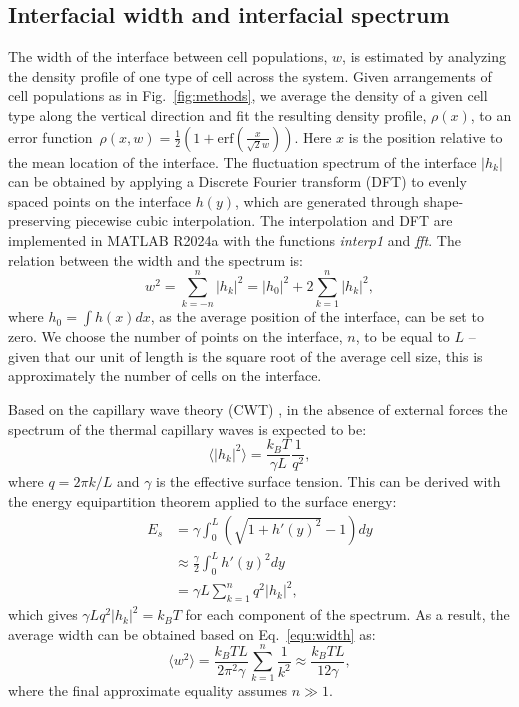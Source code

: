 \documentclass[twoside,twocolumn,9pt]{article}
\begin{document}
\subsection{Interfacial width and interfacial spectrum}
The width of the interface between cell populations, $w$, is estimated by analyzing the density profile of one type of cell across the system. Given arrangements of cell populations as in  Fig.~\ref{fig:methods}, we average the density of a given cell type along the vertical direction and fit the resulting density profile, $\rho(x)$, to an error function~\cite{sides1999capillary}$\rho(x,w) = \frac{1}{2}\left(1+\text{erf}\left(\frac{x}{\sqrt{2}w}\right)\right)$. Here $x$ is the position relative to the mean location of the interface. The fluctuation spectrum of the interface $|h_k|$ can be obtained by applying a Discrete Fourier transform (DFT) to evenly spaced points on the interface $h(y)$, which are generated through shape-preserving piecewise cubic interpolation. The interpolation and DFT are implemented in MATLAB R2024a with the functions \textit{interp1} and \textit{fft}. The relation between the width and the spectrum is: 
\begin{equation} \label{equ:width}
    w^2=\sum_{k=-n}^n |h_k|^2 = |h_0|^2 + 2\sum_{k=1}^n |h_k|^2, 
\end{equation}
where $h_0 = \int h(x) dx$, as the average position of the interface, can be set to zero. We choose the number of points on the interface, $n$, to be equal to $L$ -- given that our unit of length is the square root of the average cell size, this is approximately the number of cells on the interface.

Based on the capillary wave theory (CWT) \cite{rowlinson2013molecular}, in the absence of external forces the spectrum of the thermal capillary waves is expected to be:
\begin{equation} \label{equ:CWTspectrum}
    \langle |h_k|^2 \rangle = \frac{k_BT}{\gamma L} \frac{1}{q^2}, 
\end{equation}
where $q=2\pi k/L$ and $\gamma$ is the effective surface tension. This can be derived with the energy equipartition theorem applied to the surface energy:
\begin{align}\label{equ:CWTenergy}
    E_s &= \gamma \int_0^L \left(\sqrt{1+h'(y)^2} -1\right) dy \nonumber \\
    &\approx \frac{\gamma}{2}\int_0^L h'(y)^2 dy  \\
    &= \gamma L \sum_{k=1}^n q^2 |h_k|^2, \nonumber
\end{align}
which gives $\gamma Lq^2|h_k|^2 = k_B T$ for each component of the spectrum. As a result, the average width can be obtained based on Eq.~\ref{equ:width} as:
\begin{equation}
    \langle w^2\rangle = \frac{k_BT L}{2\pi^2 \gamma}\sum_{k=1}^n \frac{1}{k^2} \approx \frac{k_B T L}{12\gamma}, 
    \label{equ:cwt_width}
\end{equation}
where the final approximate equality assumes $n\gg 1$. 
\end{document}
